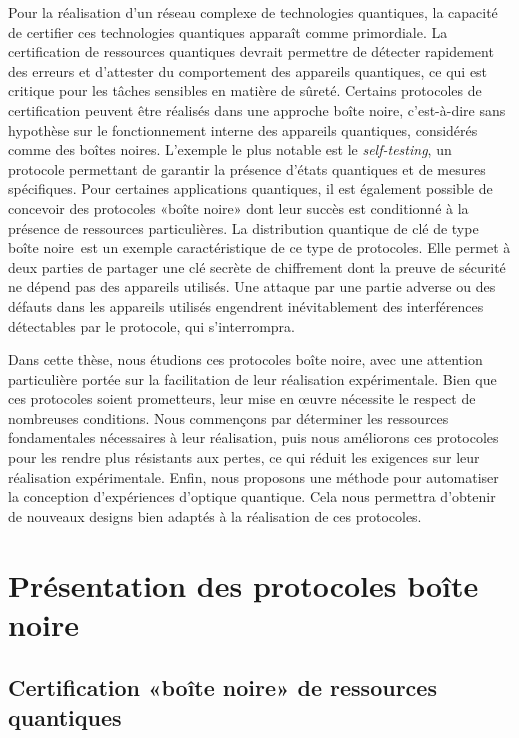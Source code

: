 \medbreak

Pour la réalisation d'un réseau complexe de technologies quantiques, la capacité de certifier ces technologies quantiques apparaît comme primordiale. 
La certification de ressources quantiques devrait permettre de détecter rapidement des erreurs et d'attester du comportement des appareils quantiques, ce qui est critique pour les tâches sensibles en matière de sûreté.
Certains protocoles de certification peuvent être réalisés dans une approche \guillemotleft boîte noire\guillemotright, c'est-à-dire sans hypothèse sur le fonctionnement interne des appareils quantiques, considérés comme des boîtes noires. 
L'exemple le plus notable est le \textit{self-testing}, un protocole permet\-tant de garantir la présence d'états quantiques et de mesures spécifiques.
Pour certaines applications quantiques, il est également possible de concevoir des protocoles «boîte noire» dont leur succès est conditionné à la présence de ressources particulières.
La distribution quantique de clé de type \guillemotleft boîte noire\guillemotright~est un exemple caractéristique de ce type de protocoles. 
Elle permet à deux parties de partager une clé secrète de chiffrement dont la preuve de sécurité ne dépend pas des appareils uti\-lisés. 
Une attaque par une partie adverse ou des défauts dans les appareils utilisés engendrent inévitablement des interférences détectables par le protocole, qui s'interrompra.

\medbreak

Dans cette thèse, nous étudions ces protocoles \guillemotleft boîte noire\guillemotright, avec une attention particulière portée sur la facilitation de leur réalisation expérimentale.
Bien que ces protocoles soient prometteurs, leur mise en œuvre nécessite le respect de nombreuses conditions. 
Nous commençons par déterminer les ressources fondamentales nécessaires à leur réalisation, puis nous améliorons ces protocoles pour les rendre plus résistants aux pertes, ce qui réduit les exigences sur leur réalisation expérimentale. 
Enfin, nous proposons une méthode pour automatiser la conception d'expériences d'optique quantique. 
Cela nous permettra d'obtenir de nouveaux designs bien adaptés à la réalisation de ces protocoles.

\section{Présentation des protocoles \guillemotleft boîte noire\guillemotright}

\subsection{Certification «boîte noire» de ressources quantiques}

